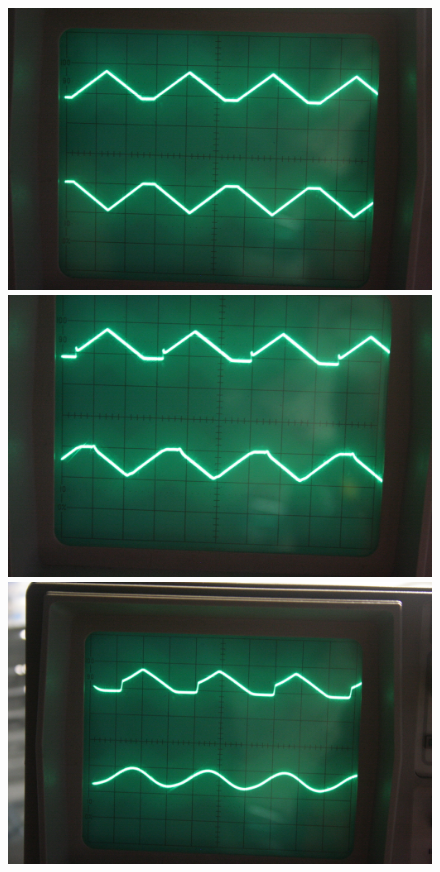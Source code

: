 \begin{figure}[htbp]
	\centering
	\begin{minipage}{.3\linewidth}
	\includegraphics[width=\linewidth]{Fotos/IMG_0776-1500.jpg}
	\end{minipage}
	\hfill
	\begin{minipage}{.3\linewidth}
	\includegraphics[width=\linewidth]{Fotos/IMG_0777-1500.jpg}
	\end{minipage}
	\hfill
	\begin{minipage}{.3\linewidth}
	\includegraphics[width=\linewidth]{Fotos/IMG_0778-1500.jpg}
	\end{minipage}


\end{figure}
